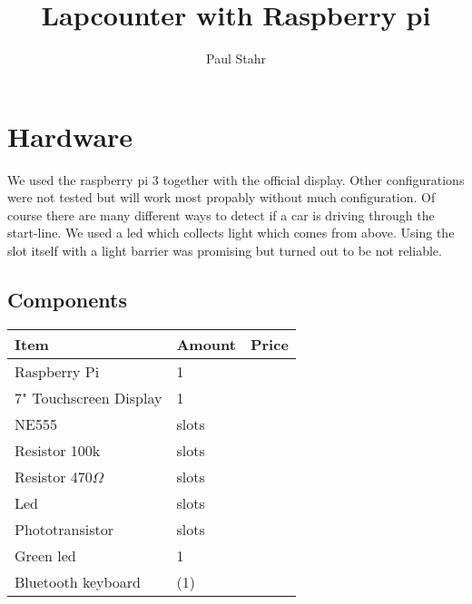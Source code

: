 \documentclass[11pt, a4paper, UKenglish, parskip=half+]{scrbook}
\author{Paul Stahr}
\title{Lapcounter with Raspberry pi}
\newcommand{\slots}{slots}
\begin{document}
\maketitle
\chapter{Hardware}
We used the raspberry pi 3 together with the official display. Other configurations were not tested but will work most propably without much configuration. Of course there are many different ways to detect if a car is driving through the start-line. We used a led which collects light which comes from above. Using the slot itself with a light barrier was promising but turned out to be not reliable.
\section{Components}
\begin{table}[H]
\begin{tabular}{l l l}
Item& Amount & Price\\\hline
Raspberry Pi & 1\\
7" Touchscreen Display & 1\\
NE555 & \slots \\
Resistor 100k & \slots \\
Resistor 470$\Omega$ & \slots \\
Led & \slots \\
Phototransistor & \slots\\
Green led & 1\\
Bluetooth keyboard & (1) \\
\end{tabular}
\end{table}
\end{document}
